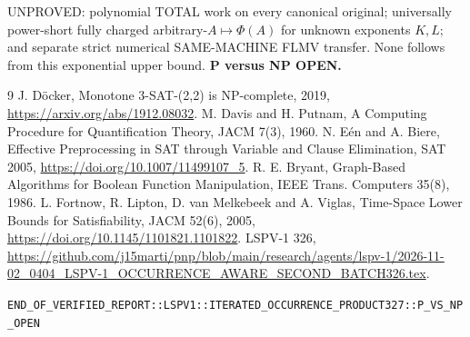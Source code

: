 \documentclass[11pt]{article}
\begin{document}
UNPROVED: polynomial TOTAL work on every canonical original; universally power-short fully charged arbitrary-$A\mapsto\Phi(A)$ for unknown exponents $K,L$; and separate strict numerical SAME-MACHINE FLMV transfer. None follows from this exponential upper bound. \textbf{P versus NP OPEN.}
\begin{thebibliography}{9}
 J. D\"ocker, Monotone 3-SAT-(2,2) is NP-complete, 2019, \url{https://arxiv.org/abs/1912.08032}.
 M. Davis and H. Putnam, A Computing Procedure for Quantification Theory, JACM 7(3), 1960.
 N. E\'en and A. Biere, Effective Preprocessing in SAT through Variable and Clause Elimination, SAT 2005, \url{https://doi.org/10.1007/11499107_5}.
 R. E. Bryant, Graph-Based Algorithms for Boolean Function Manipulation, IEEE Trans. Computers 35(8), 1986.
 L. Fortnow, R. Lipton, D. van Melkebeek and A. Viglas, Time-Space Lower Bounds for Satisfiability, JACM 52(6), 2005, \url{https://doi.org/10.1145/1101821.1101822}.
 LSPV-1 326, \url{https://github.com/j15marti/pnp/blob/main/research/agents/lspv-1/2026-11-02_0404_LSPV-1_OCCURRENCE_AWARE_SECOND_BATCH326.tex}.
\end{thebibliography}
\noindent\texttt{END\_OF\_VERIFIED\_REPORT::LSPV1::ITERATED\_OCCURRENCE\_PRODUCT327::P\_VS\_NP\_OPEN}
\end{document}
